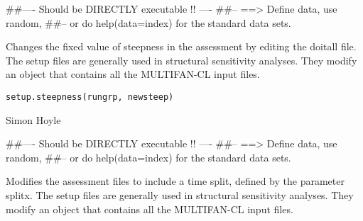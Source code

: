 \documentclass[a4paper]{book}
\begin{document}
%
\begin{Examples}
\begin{ExampleCode}
##---- Should be DIRECTLY executable !! ----
##-- ==>  Define data, use random,
##--	or do  help(data=index)  for the standard data sets.

\end{ExampleCode}
\end{Examples}
%
\begin{Description}\relax

Changes the fixed value of steepness in the assessment by editing the doitall file. 
The setup files are generally used in structural sensitivity analyses. They modify an object that contains all the MULTIFAN-CL input files. 
\end{Description}
%
\begin{Usage}
\begin{verbatim}
setup.steepness(rungrp, newsteep)
\end{verbatim}
\end{Usage}
%
\begin{Arguments}
\begin{ldescription}
\item[\code{rungrp}] 


\item[\code{newsteep}] 


\end{ldescription}
\end{Arguments}
%
\begin{Author}\relax

Simon Hoyle
\end{Author}
%
\begin{Examples}
\begin{ExampleCode}
##---- Should be DIRECTLY executable !! ----
##-- ==>  Define data, use random,
##--	or do  help(data=index)  for the standard data sets.

\end{ExampleCode}
\end{Examples}
%
\begin{Description}\relax

Modifies the assessment files to include a time split, defined by the parameter splitx. 
The setup files are generally used in structural sensitivity analyses. They modify an object that contains all the MULTIFAN-CL input files. 
\end{Description}
\end{document}
